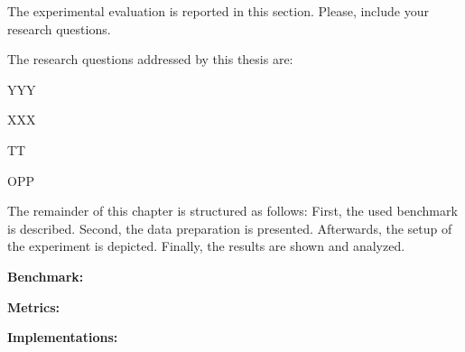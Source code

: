 The experimental evaluation is reported in this section. Please, include your research questions. 

The research questions addressed by this thesis are:
\begin{inparaenum}[\bfseries RQ1)]
    \item YYY
    \item XXX
    \item TT
    \item OPP

\end{inparaenum}
The remainder of this chapter is structured as follows:
First, the used benchmark is described.
Second, the data preparation is presented.
Afterwards, the setup of the experiment is depicted.
Finally, the results are shown and analyzed.







\textbf{Benchmark:}


\textbf{Metrics:}


\textbf{Implementations:}




